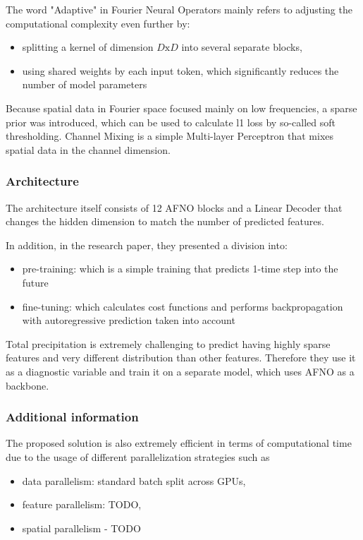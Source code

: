\noindent The word "Adaptive" in Fourier Neural Operators mainly refers to adjusting the computational complexity even further by:
\begin{itemize}
    \item splitting a kernel of dimension $D\text{x}D$ into several separate blocks,
    \item using shared weights by each input token, which significantly reduces the number of model parameters
\end{itemize}

\noindent Because spatial data in Fourier space focused mainly on low frequencies, a sparse prior was introduced, which can be used to calculate l1 loss by so-called soft thresholding. Channel Mixing is a simple Multi-layer Perceptron that mixes spatial data in the channel dimension.

\subsubsection{Architecture}
The architecture itself consists of 12 AFNO blocks and a Linear Decoder that changes the hidden dimension to match the number of predicted features.

\noindent In addition, in the research paper, they presented a division into:
\begin{itemize}
    \item pre-training: which is a simple training that predicts 1-time step into the future
    \item fine-tuning: which calculates cost functions and performs backpropagation with autoregressive prediction taken into account
\end{itemize}

\noindent Total precipitation is extremely challenging to predict having highly sparse features and very different distribution than other features. Therefore they use it as a diagnostic variable and train it on a separate model, which uses AFNO as a backbone.

\subsubsection{Additional information}
The proposed solution is also extremely efficient in terms of computational time due to the usage of different parallelization strategies such as
\begin{itemize}
    \item data parallelism: standard batch split across GPUs,
    \item feature parallelism: TODO,
    \item spatial parallelism - TODO
\end{itemize}


